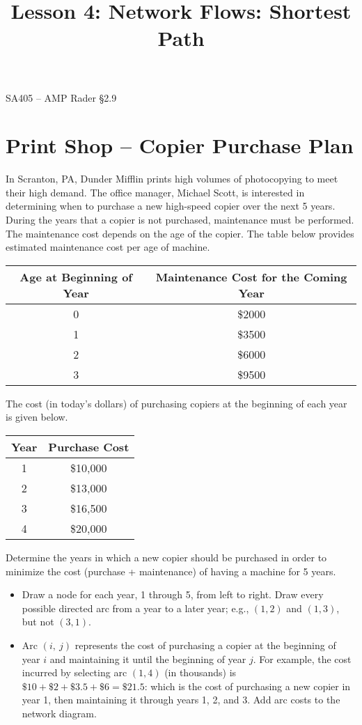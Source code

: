 \documentclass[11pt]{article}
\makeatletter
\theoremstyle{definition}
\renewcommand{\maketitle}{
  \noindent SA405 -- AMP \hfill Rader \S 2.9 \\

  \begin{center}\Large{\textbf{\@title}}\end{center}
}
\makeatother
\begin{document}
  
\title{Lesson 4: Network Flows:  Shortest Path}

\maketitle

\section{Print Shop -- Copier Purchase Plan}
In Scranton, PA, Dunder Mifflin prints high volumes of photocopying to meet their high demand. The office manager, Michael Scott, is interested in determining when to purchase a new high-speed copier over the next 5 years.  During the years that a copier is not purchased, maintenance must be performed.  The maintenance cost depends on the age of the copier.  The table below provides estimated maintenance cost per age of machine.

\begin{center}
\begin{tabular}{cc}
\hline
Age at Beginning of Year & Maintenance Cost for the Coming Year \\
\hline
0 & \$2000 \\
1 & \$3500 \\
2 & \$6000 \\
3 & \$9500 \\
\hline
\end{tabular}
\end{center}

The cost (in today's dollars) of purchasing copiers at the beginning of each year is given below.

\begin{center}
\begin{tabular}{cc}
\hline
Year & Purchase Cost \\
\hline
1 & \$10,000 \\
2 & \$13,000 \\
3 & \$16,500 \\
4 & \$20,000 \\
\hline
\end{tabular}
\end{center}

Determine the years in which a new copier should be purchased in order to minimize the cost (purchase + maintenance) of having a machine for 5 years.

\medskip

\begin{itemize}
\item Draw a node for each year, 1 through 5, from left to right.  Draw every possible directed arc from a year to a later year; e.g., $(1,2)$ and $(1,3)$, but not $(3,1)$.   \newpage


\item Arc $(i,~j)$ represents the cost of purchasing a copier at the beginning of year $i$ and maintaining it until the beginning of year $j$.  For example, the cost incurred by selecting arc $(1,4)$ (in thousands) is $\$10 + \$2 + \$3.5 + \$6 = \$21.5$: which is the cost of purchasing a new copier in year 1, then maintaining it through years 1, 2, and 3. Add arc costs to the network diagram. 
\end{itemize}
\end{document}
